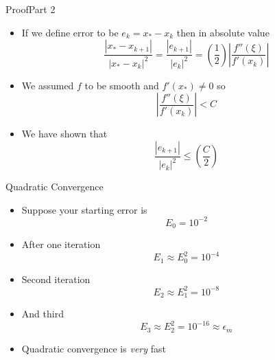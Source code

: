 \documentclass[10pt]{beamer}
\begin{document}
\begin{frame}{Proof}{Part 2}

\begin{itemize}
\item If we define error to be $e_k = x_* - x_k$ then in absolute value 
\begin{equation*}
  \frac{\left|x_{*}-x_{k+1}\right|}{\left|x_{*}-x_k\right|^2}  = 
  \frac{ | e_{k+1} | }{ |e_k|^2} =  \left(\frac{1}{2}\right) \left|\frac{f''(\xi)}{f'(x_k)}\right|
\end{equation*}
\item We assumed $f$ to be smooth and $f'(x_*) \ne 0$ so 
$$\left|\frac{f''(\xi)}{f'(x_k)}\right| < C$$

\item We have shown that 
    $$\frac{ | e_{k+1} | }{ |e_k|^2} \le  \left(\frac{C}{2}\right)$$ 
\end{itemize}


\end{frame}

\begin{frame}{Quadratic Convergence}


\begin{itemize}
    \item Suppose your starting error is 
    $$E_0=10^{-2}$$

    \item<2-> After one iteration
    $$
    E_1 \approx E_0^2 = 10^{-4}
    $$
    \item<3-> Second iteration
    $$
    E_2 \approx E_1^2 = 10^{-8}
    $$
    \item<4-> And third 
    $$
    E_3 \approx E_2^2 = 10^{-16} \approx \epsilon_m
    $$
    \vfill 
    \item<4> Quadratic convergence is \textit{very} fast
\end{itemize}
\end{frame}
\end{document}
